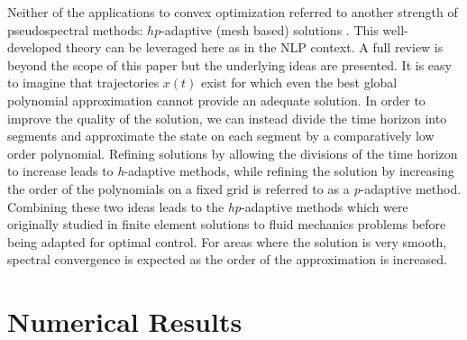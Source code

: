 \documentclass[10pt,a4paper]{article}
\begin{document}
	Neither of the applications \cite{PS_Convex,PS_Convex_ascent} to convex optimization referred to another strength of pseudospectral methods: $ hp $-adaptive (mesh based) solutions \cite{GPOPS,hp_adapt}. This well-developed theory can be leveraged here as in the NLP context. A full review is beyond the scope of this paper but the underlying ideas are presented. It is easy to imagine that trajectories $x(t)$ exist for which even the best global polynomial approximation cannot provide an adequate solution. In order to improve the quality of the solution, we can instead divide the time horizon into segments and approximate the state on each segment by a comparatively low order polynomial. Refining solutions by allowing the divisions of the time horizon to increase leads to \textit{h}-adaptive methods, while refining the solution by increasing the order of the polynomials on a fixed grid is referred to as a \textit{p}-adaptive method. Combining these two ideas leads to the \textit{hp}-adaptive methods which were originally studied in finite element solutions to fluid mechanics problems \cite{HPAdapt_origin} before being adapted for optimal control. For areas where the solution is very smooth, spectral convergence is expected as the order of the approximation is increased.
	
	
	
	
	\section{Numerical Results}

	
\end{document}
